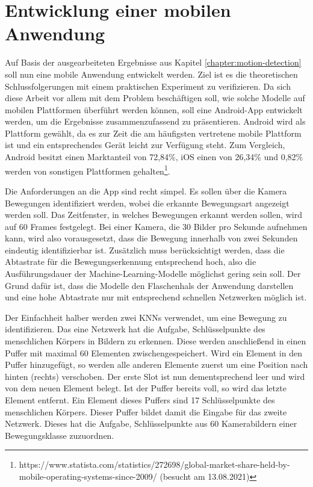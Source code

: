 \chapter{Entwicklung einer mobilen Anwendung}
Auf Basis der ausgearbeiteten Ergebnisse aus Kapitel
\ref{chapter:motion-detection} soll nun eine mobile Anwendung entwickelt werden.
Ziel ist es die theoretischen Schlussfolgerungen mit einem praktischen
Experiment zu verifizieren. Da sich diese Arbeit vor allem mit dem Problem
beschäftigen soll, wie solche Modelle auf mobilen Plattformen überführt werden
können, soll eine Android-App entwickelt werden, um die Ergebnisse
zusammenzufassend zu präsentieren. Android wird als Plattform gewählt, da es zur
Zeit die am häufigsten vertretene mobile Plattform ist und ein entsprechendes
Gerät leicht zur Verfügung steht. Zum Vergleich, Android besitzt einen
Marktanteil von 72,84\%, iOS einen von 26,34\% und 0,82\% werden von sonstigen
Plattformen
gehalten\footnote{https://www.statista.com/statistics/272698/global-market-share-held-by-mobile-operating-systems-since-2009/
(besucht am 13.08.2021)}.

Die Anforderungen an die App sind recht simpel. Es sollen über die Kamera
Bewegungen identifiziert werden, wobei die erkannte Bewegungsart angezeigt
werden soll. Das Zeitfenster, in welches Bewegungen erkannt werden sollen, wird
auf 60 Frames festgelegt. Bei einer Kamera, die 30 Bilder pro Sekunde aufnehmen
kann, wird also vorausgesetzt, dass die Bewegung innerhalb von zwei Sekunden
eindeutig identifizierbar ist. Zusätzlich muss berücksichtigt werden, dass die
Abtastrate für die Bewegungserkennung entsprechend hoch, also die
Ausführungsdauer der Machine-Learning-Modelle möglichst gering sein soll. Der
Grund dafür ist, dass die Modelle den Flaschenhals der Anwendung darstellen und
eine hohe Abtastrate nur mit entsprechend schnellen Netzwerken möglich ist.

Der Einfachheit halber werden zwei KNNs verwendet, um eine Bewegung zu
identifizieren. Das eine Netzwerk hat die Aufgabe, Schlüsselpunkte des
menschlichen Körpers in Bildern zu erkennen. Diese werden anschließend in einen
Puffer mit maximal 60 Elementen zwischengespeichert. Wird ein Element in den
Puffer hinzugefügt, so werden alle anderen Elemente zuerst um eine Position nach
hinten (rechts) verschoben. Der erste Slot ist nun dementsprechend leer und wird
von dem neuen Element belegt. Ist der Puffer bereits voll, so wird das letzte
Element entfernt. Ein Element dieses Puffers sind 17 Schlüsselpunkte des
menschlichen Körpers. Dieser Puffer bildet damit die Eingabe für das zweite
Netzwerk.  Dieses hat die Aufgabe, Schlüsselpunkte aus 60 Kamerabildern einer
Bewegungsklasse zuzuordnen.